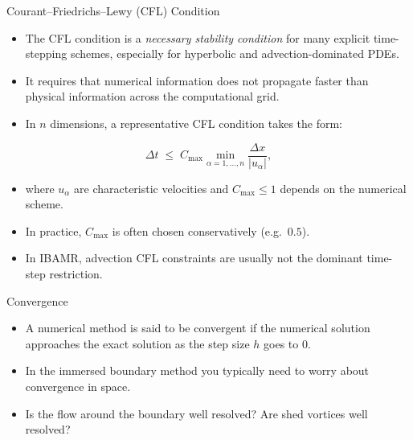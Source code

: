 \documentclass{beamer}
\begin{document}
\begin{frame}{Courant--Friedrichs--Lewy (CFL) Condition}
\small
\begin{itemize}
    \item The CFL condition is a \emph{necessary stability condition} for many explicit time-stepping schemes,
    especially for hyperbolic and advection-dominated PDEs.
    
    \item It requires that numerical information does not propagate faster than physical information
    across the computational grid.
    
    \item In $n$ dimensions, a representative CFL condition takes the form:
\end{itemize}

\medskip
\[
\Delta t \;\le\; C_{\max}
\min_{\alpha=1,\dots,n}
\frac{\Delta x}{|u_\alpha|},
\]

\medskip
\begin{itemize}
    \item where $u_\alpha$ are characteristic velocities and $C_{\max}\le 1$ depends on the numerical scheme.
    \item In practice, $C_{\max}$ is often chosen conservatively (e.g.\ $0.5$).
    \item In IBAMR, advection CFL constraints are usually not the dominant time-step restriction.
\end{itemize}
\end{frame}


\begin{frame}{Convergence}
\small
\begin{itemize}
    \item A numerical method is said to be convergent if the numerical solution approaches the exact solution as the step size $h$ goes to 0.
    \item In the immersed boundary method you typically need to worry about convergence in space.
    \item Is the flow around the boundary well resolved? Are shed vortices well resolved?
\end{itemize}
\end{frame}
\end{document}
